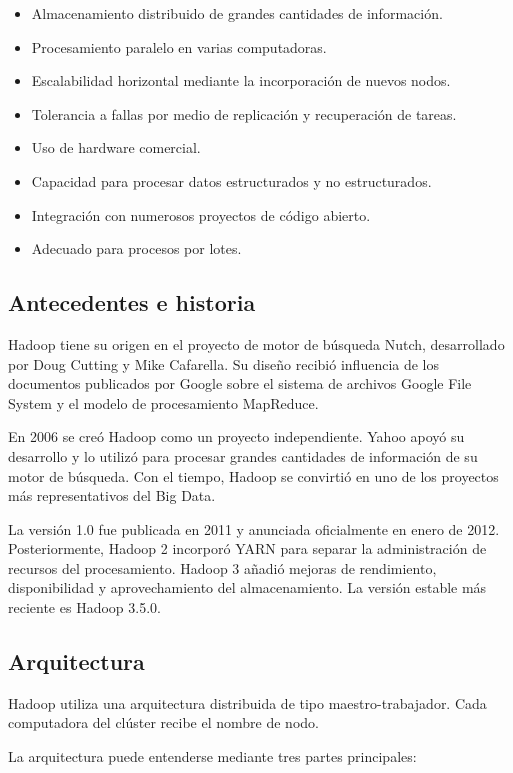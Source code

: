 \begin{itemize}
    \item Almacenamiento distribuido de grandes cantidades de información.
    \item Procesamiento paralelo en varias computadoras.
    \item Escalabilidad horizontal mediante la incorporación de nuevos nodos.
    \item Tolerancia a fallas por medio de replicación y recuperación de tareas.
    \item Uso de hardware comercial.
    \item Capacidad para procesar datos estructurados y no estructurados.
    \item Integración con numerosos proyectos de código abierto.
    \item Adecuado para procesos por lotes.
\end{itemize}

\subsection{Antecedentes e historia}

Hadoop tiene su origen en el proyecto de motor de búsqueda Nutch, desarrollado
por Doug Cutting y Mike Cafarella. Su diseño recibió influencia de los
documentos publicados por Google sobre el sistema de archivos Google File
System y el modelo de procesamiento MapReduce.

En 2006 se creó Hadoop como un proyecto independiente. Yahoo apoyó su
desarrollo y lo utilizó para procesar grandes cantidades de información de su
motor de búsqueda. Con el tiempo, Hadoop se convirtió en uno de los proyectos
más representativos del Big Data.

La versión 1.0 fue publicada en 2011 y anunciada oficialmente en enero de 2012.
Posteriormente, Hadoop 2 incorporó YARN para separar la administración de
recursos del procesamiento. Hadoop 3 añadió mejoras de rendimiento,
disponibilidad y aprovechamiento del almacenamiento. La versión estable más
reciente es Hadoop 3.5.0.

\subsection{Arquitectura}

Hadoop utiliza una arquitectura distribuida de tipo maestro-trabajador. Cada
computadora del clúster recibe el nombre de nodo.

La arquitectura puede entenderse mediante tres partes principales:

